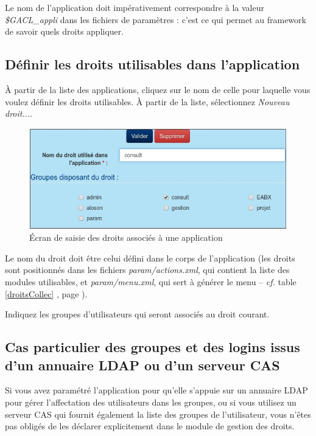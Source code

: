 Le nom de l'application doit impérativement correspondre à la valeur \textit{\$GACL\_appli} dans les fichiers de paramètres : c'est ce qui permet au framework de savoir quels droits appliquer.

\subsection{Définir les droits utilisables dans l'application}

À partir de la liste des applications, cliquez sur le nom de celle pour laquelle vous voulez définir les droits utilisables. 
À partir de la liste, sélectionnez \textit{Nouveau droit...}.

\begin{figure}[H]
\includegraphics[width=\linewidth]{images/appli_droit}
\caption{Écran de saisie des droits associés à une application}
\label{applidroit}
\end{figure}

Le nom du droit doit être celui défini dans le corps de l'application (les droits sont positionnés dans les fichiers \textit{param/actions.xml}, qui contient la liste des modules utilisables, et \textit{param/menu.xml}, qui sert à générer le menu -- \textit{cf.} table \ref{droitsCollec} \textit{}, page \pageref{droitsCollec}).

Indiquez les groupes d'utilisateurs qui seront associés au droit courant.

\subsection{Cas particulier des groupes et des logins issus d'un annuaire LDAP ou d'un serveur CAS}

Si vous avez paramétré l'application pour qu'elle s'appuie sur un annuaire LDAP pour gérer l'affectation des utilisateurs dans les groupes, ou si vous utilisez un serveur CAS qui fournit également la liste des groupes de l'utilisateur,
vous n'êtes pas obligés de les déclarer explicitement dans le module de gestion des droits.

